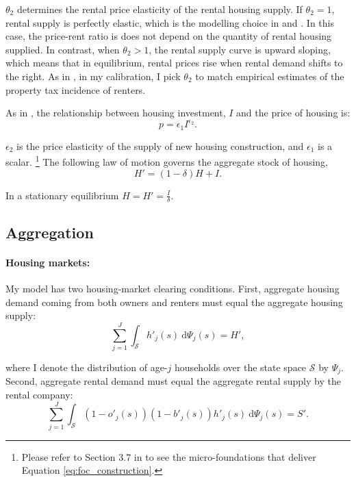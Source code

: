 \documentclass[parskip=full]{article}
\begin{document}
\noindent $\theta_2$ determines the rental price elasticity of the rental housing supply. If $\theta_2=1$, rental supply is perfectly elastic, which is the modelling choice in \citet{gervais} and \citet{kaplanetal-2019}. In this case, the price-rent ratio is does not depend on the quantity of rental housing supplied. In contrast, when $\theta_{2}>1$, the rental supply curve is upward sloping, which means that in equilibrium, rental prices rise when rental demand shifts to the right. As in \citet{rs-2023}, in my calibration, I pick $\theta_2$ to match empirical estimates of the property tax incidence of renters.

As in \citet{az-2024}, the relationship between housing investment, $I$ and the price of housing is:
\begin{equation}
\label{eq:foc_construction}
p = \epsilon_1 I^{\epsilon_2}.
\end{equation}

\noindent $\epsilon_2$ is the price elasticity of the supply of new housing construction, and $\epsilon_1$ is a scalar. \footnote{Please refer to Section 3.7 in \citet{rs-2023} to see the micro-foundations that deliver Equation \eqref{eq:foc_construction}.} The following law of motion governs the aggregate stock of housing,
\begin{equation}\label{eq:lom_h}
H' = (1-\delta)H + I.
\end{equation}

\noindent In a stationary equilibrium $H=H'=\frac{I}{\delta}$.

\subsection{Aggregation}\label{subsection: aggregation}

\paragraph{Housing markets:} My model has two housing-market clearing conditions. First, aggregate housing demand coming from both owners and renters must equal the aggregate housing supply:
\begin{equation}
    \label{eq:mkt_h}
    \sum_{j=1}^J \int_{\mathcal{S}} h'_j(s)\ \mathrm{d}\Psi_j(s) = H',
\end{equation}

\noindent where I denote the distribution of age-$j$ households over the state space $\mathcal{S}$ by $\Psi_j$. Second, aggregate rental demand must equal the aggregate rental supply by the rental company:
\begin{equation}
    \label{eq:mkt_r}
    \sum_{j=1}^J \int_{\mathcal{S}} (1-o'_j(s))(1-b'_{j}(s))h'_j(s)\ \mathrm{d}\Psi_j(s) = S'.
\end{equation}
\end{document}

